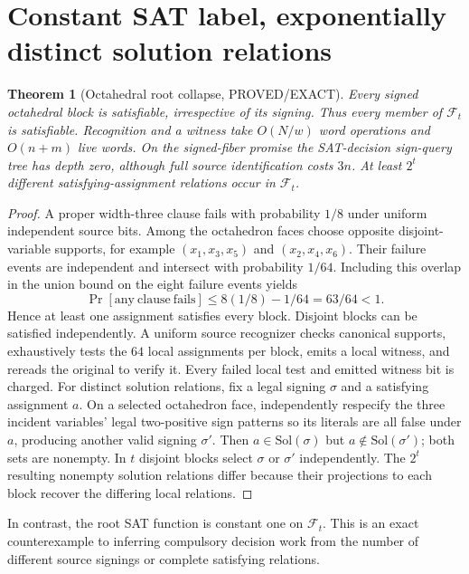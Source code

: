 \documentclass[11pt]{article}
\newtheorem{theorem}{Theorem}
\begin{document}
\section{Constant SAT label, exponentially distinct solution relations}
\begin{theorem}[Octahedral root collapse, PROVED/EXACT]
Every signed octahedral block is satisfiable, irrespective of its signing. Thus every member of $\mathcal F_t$ is satisfiable. Recognition and a witness take $O(N/w)$ word operations and $O(n+m)$ live words. On the signed-fiber promise the SAT-decision sign-query tree has depth zero, although full source identification costs $3n$. At least $2^t$ different satisfying-assignment relations occur in $\mathcal F_t$.
\end{theorem}
\begin{proof}
A proper width-three clause fails with probability $1/8$ under uniform independent source bits. Among the octahedron faces choose opposite disjoint-variable supports, for example $(x_1,x_3,x_5)$ and $(x_2,x_4,x_6)$. Their failure events are independent and intersect with probability $1/64$. Including this overlap in the union bound on the eight failure events yields
\[
\Pr[\mathrm{any\ clause\ fails}]
\le 8(1/8)-1/64=63/64<1.
\]
Hence at least one assignment satisfies every block. Disjoint blocks can be satisfied independently. A uniform source recognizer checks canonical supports, exhaustively tests the $64$ local assignments per block, emits a local witness, and rereads the original to verify it. Every failed local test and emitted witness bit is charged.
For distinct solution relations, fix a legal signing $\sigma$ and a satisfying assignment $a$. On a selected octahedron face, independently respecify the three incident variables' legal two-positive sign patterns so its literals are all false under $a$, producing another valid signing $\sigma'$. Then $a\in\mathrm{Sol}(\sigma)$ but $a\notin\mathrm{Sol}(\sigma')$; both sets are nonempty. In $t$ disjoint blocks select $\sigma$ or $\sigma'$ independently. The $2^t$ resulting nonempty solution relations differ because their projections to each block recover the differing local relations.
\end{proof}
In contrast, the root SAT function is constant one on $\mathcal F_t$. This is an exact counterexample to inferring compulsory decision work from the number of different source signings or complete satisfying relations.
\end{document}
